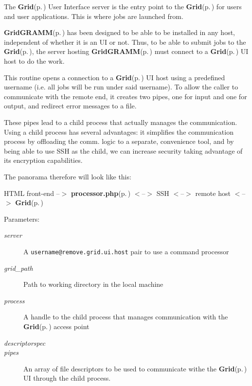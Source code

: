 The {\bf Grid}{\rm (p.\,\pageref{classGrid})} User Interface server is the entry point to the {\bf Grid}{\rm (p.\,\pageref{classGrid})} for users and user applications. This is where jobs are launched from.

{\bf Grid\-GRAMM}{\rm (p.\,\pageref{namespaceGridGRAMM})} has been designed to be able to be installed in any host, independent of whether it is an UI or not. Thus, to be able to submit jobs to the {\bf Grid}{\rm (p.\,\pageref{classGrid})}, the server hosting {\bf Grid\-GRAMM}{\rm (p.\,\pageref{namespaceGridGRAMM})} must connect to a {\bf Grid}{\rm (p.\,\pageref{classGrid})} UI host to do the work.

This routine opens a connection to a {\bf Grid}{\rm (p.\,\pageref{classGrid})} UI host using a predefined username (i.e. all jobs will be run under said username). To allow the caller to communicate with the remote end, it creates two pipes, one for input and one for output, and redirect error messages to a file.

These pipes lead to a child process that actually manages the communication. Using a child process has several advantages: it simplifies the communication process by offloading the comm. logic to a separate, convenience tool, and by being able to use SSH as the child, we can increase security taking advantage of its encryption capabilities.

The panorama therefore will look like this:

HTML front-end --$>$ {\bf processor.php}{\rm (p.\,\pageref{processor_8php})} $<$--$>$ SSH $<$--$>$ remote host $<$--$>$ {\bf Grid}{\rm (p.\,\pageref{classGrid})}

\begin{Desc}
\item[Parameters:]
\begin{description}
\item[{\em server}]A {\tt username@remove.grid.ui.host} pair to use a command processor \item[{\em grid\_\-path}]Path to working directory in the local machine \item[{\em process}]A handle to the child process that manages communication with the {\bf Grid}{\rm (p.\,\pageref{classGrid})} access point \item[{\em descriptorspec}]\item[{\em pipes}]An array of file descriptors to be used to communicate withe the {\bf Grid}{\rm (p.\,\pageref{classGrid})} UI through the child process. \end{description}
\end{Desc}


